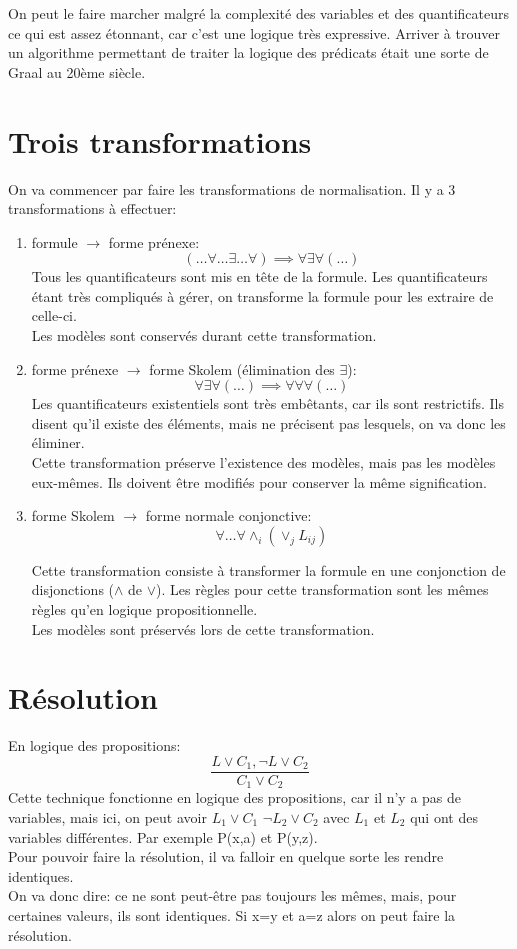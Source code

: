 {On peut le faire marcher malgré la complexité des variables et des quantificateurs ce qui est assez étonnant,
car c'est une logique très expressive. 
Arriver à trouver un algorithme permettant de traiter la logique des prédicats était une sorte de Graal au 20ème siècle. 

\section{Trois transformations} 
On va commencer par faire les transformations de normalisation. Il y a 3 transformations à effectuer: 
\begin{enumerate}
    \item formule $\to$ forme prénexe: $$(\ldots{}\forall{}\ldots{}\exists{}\ldots{}\forall{} )\implies \forall{}\exists{}\forall{}(\ldots{})$$
    Tous les quantificateurs sont mis en tête de la formule. Les quantificateurs étant très compliqués à gérer, on transforme la formule pour les extraire de celle-ci. \\Les modèles sont conservés durant cette transformation.
    \item forme prénexe $\to$ forme Skolem (élimination des $\exists{}$): $$ \forall{}\exists{}\forall{}(\ldots{})  \implies \forall{}\forall{}\forall{}(\ldots{}) $$
    Les quantificateurs existentiels sont très embêtants, car ils sont restrictifs. Ils disent qu'il existe des éléments, mais ne précisent pas lesquels, on va donc les éliminer. \\
    Cette transformation préserve l'existence des modèles, mais pas les modèles eux-mêmes. Ils doivent être modifiés pour conserver la même signification. 
    \item forme Skolem $\to$ forme normale conjonctive: 
    \[\forall \ldots \forall \land_i(\lor_j L_{ij})\]

Cette transformation consiste à transformer la formule en une conjonction de disjonctions ($\land$ de $\lor$). Les règles pour cette transformation sont les mêmes règles qu'en logique propositionnelle. \\
Les modèles sont préservés lors de cette transformation. 
\end{enumerate}

\section{Résolution}
En logique des propositions: $$\frac{L\lor C_1, \neg L \lor C_2}{C_1\lor C_2}$$
Cette technique fonctionne en logique des propositions, car il n'y a pas de variables, mais ici, on peut avoir $L_1 \lor C_1$ \hspace{10pt} $\neg L_2 \lor C_2$  avec $L_1$ et $L_2$ qui ont des variables différentes. Par exemple P(x,a) et P(y,z).\\
Pour pouvoir faire la résolution, il va falloir en quelque sorte les rendre identiques. \\
On va donc dire: ce ne sont peut-être pas toujours les mêmes, mais, pour certaines valeurs, ils sont identiques. Si x=y et a=z alors on peut faire la résolution. 
}
